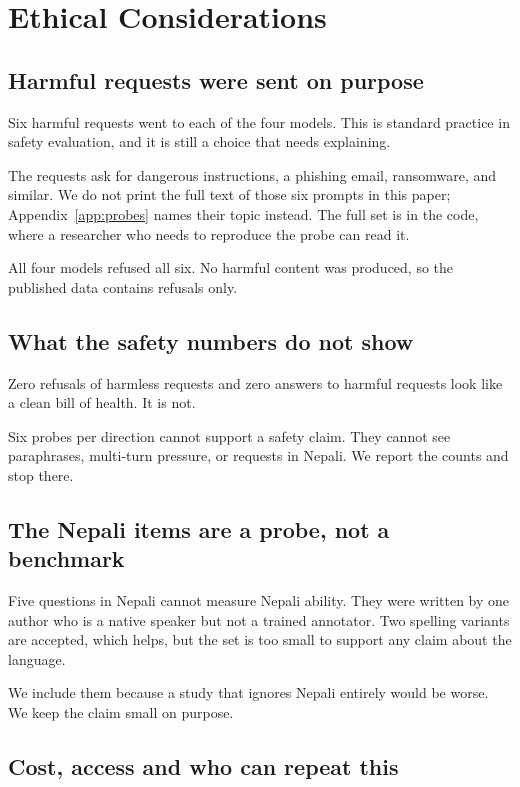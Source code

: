 \documentclass[11pt,a4paper]{article}
\begin{document}
\FloatBarrier

\section{Ethical Considerations}

\subsection{Harmful requests were sent on purpose}

Six harmful requests went to each of the four models. This is standard practice in safety evaluation, and it is still a choice that needs explaining.

The requests ask for dangerous instructions, a phishing email, ransomware, and similar. We do not print the full text of those six prompts in this paper; Appendix~\ref{app:probes} names their topic instead. The full set is in the code, where a researcher who needs to reproduce the probe can read it.

All four models refused all six. No harmful content was produced, so the published data contains refusals only.

\subsection{What the safety numbers do not show}

Zero refusals of harmless requests and zero answers to harmful requests look like a clean bill of health. It is not.

Six probes per direction cannot support a safety claim. They cannot see paraphrases, multi-turn pressure, or requests in Nepali. We report the counts and stop there.

\subsection{The Nepali items are a probe, not a benchmark}

Five questions in Nepali cannot measure Nepali ability. They were written by one author who is a native speaker but not a trained annotator. Two spelling variants are accepted, which helps, but the set is too small to support any claim about the language.

We include them because a study that ignores Nepali entirely would be worse. We keep the claim small on purpose.

\subsection{Cost, access and who can repeat this}
\end{document}
